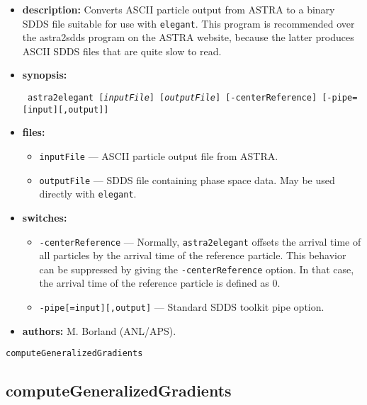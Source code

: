 \documentclass[11pt]{article}
\begin{document}
\begin{itemize}
\item {\bf description:}   Converts ASCII particle output from ASTRA to a binary
SDDS file suitable for use with {\tt elegant}.  This program is recommended over
the astra2sdds program on the ASTRA website, because the latter produces ASCII SDDS
files that are quite slow to read.

\item {\bf synopsis:}
\begin{flushleft}{\tt
astra2elegant [{\em inputFile}] [{\em outputFile}] [-centerReference] [-pipe=[input][,output]]
}\end{flushleft}

\item {\bf files:}
\begin{itemize}
\item {\tt inputFile} --- ASCII particle output file from ASTRA.
\item {\tt outputFile} --- SDDS file containing phase space data. May be used directly with 
{\tt elegant}.
\end{itemize}

\item {\bf switches:}
\begin{itemize}
\item {\tt -centerReference} --- Normally, {\tt astra2elegant} offsets the arrival time of all particles
  by the arrival time of the reference particle.  This behavior can be suppressed by giving the
  {\tt -centerReference} option.  In that case, the arrival time of the reference particle is defined
  as 0.
\item {\tt -pipe[=input][,output]} --- Standard SDDS toolkit pipe option.
\end{itemize}

\item {\bf authors:} M. Borland (ANL/APS).

\end{itemize}

\newpage
\begin{center}{\Large\verb|computeGeneralizedGradients|}\end{center}
\subsection{computeGeneralizedGradients}
\end{document}
